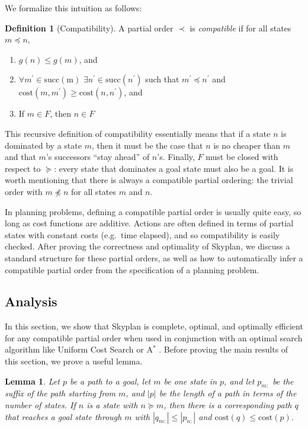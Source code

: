 \documentclass[letterpaper]{article}
\theoremstyle{plain} \newtheorem{theorem}{Theorem} \newtheorem{proposition}{Proposition} \newtheorem{lemma}{Lemma}
\theoremstyle{definition} \newtheorem{definition}{Definition} \newtheorem{conjecture}{Conjecture} \newtheorem*{example}{Example}
\theoremstyle{remark} \newtheorem*{remark}{Remark} \newtheorem*{note}{Note} \newtheorem{case}{Case}
\newcommand{\Astar}{A$^*$ }
\begin{document}
We formalize this intuition as follows:
\begin{definition}[Compatibility]
	\label{def-compatibility}
  A partial order $\prec$ is \textit{compatible} if for all states $m \preceq n$,
  \begin{enumerate}
    \item $g(n) \le g(m)$, and 
    \item $\forall m^\prime \in \mathrm{succ(m)}$ $\exists n^\prime \in
      \mathrm{succ}(n^\prime)$ such that $m^\prime \preceq n^\prime$ and
      $\mathrm{cost}(m,m^\prime) \ge \mathrm{cost}(n, n^\prime)$, and
    \item If $m \in F$, then $n \in F$
  \end{enumerate}
\end{definition}
This recursive definition of compatibility essentially means that
if a state $n$ is dominated by a state $m$, then it must be the
case that $n$ is no cheaper than $m$ and that $m$'s successors
``stay ahead'' of $n$'s. Finally, $F$ must be closed with respect
to $\succeq$: every state that dominates a goal state must also be
a goal. It is worth mentioning that there is always a compatible
partial ordering: the trivial order with $m \npreceq n$ for all
states $m$ and $n$.



In planning problems, defining a compatible partial order is usually
quite easy, so long as cost functions are additive.  Actions are
often defined in terms of partial states with constant costs (e.g.\
time elapsed), and so compatibility is easily checked.  After proving
the correctness and optimality of Skyplan, we discuss a standard
structure for these partial orders, as well as how to automatically
infer a compatible partial order from the specification of a planning problem.

\subsection{Analysis}

In this section, we show that Skyplan is complete, optimal, and
optimally efficient for any compatible partial order when used in
conjunction with an optimal search algorithm like Uniform Cost
Search or \Astar. Before proving the main results of this section,
we prove a useful lemma.

\begin{lemma}{}\label{clm-complete-lemma}
  Let $p$ be a path to a goal, let $m$ be one state in $p$, and let 
$p_{m:}$ be the suffix of the path starting from $m$, and $|p|$
be
the length of a path in terms of the number of states. If $n$ is a state
with $n \succeq m$, then there is a corresponding path $q$ that reaches a goal state
through $m$ with $|q_{m:}| \leq |p_{n:}|$ and $\mathrm{cost}(q) \leq \mathrm{cost}(p)$.
\end{lemma}
\end{document}
